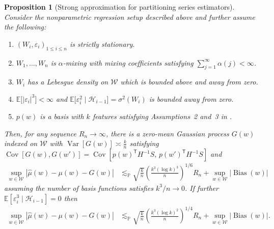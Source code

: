\documentclass[11pt,lof]{puthesis}
\renewcommand{\P}{\ensuremath{\mathbb{P}}}
\newcommand{\E}{\ensuremath{\mathbb{E}}}
\newcommand{\cH}{\ensuremath{\mathcal{H}}}
\newcommand{\cW}{\ensuremath{\mathcal{W}}}
\newcommand{\T}{\ensuremath{\mathsf{T}}}
\DeclareMathOperator{\Var}{Var}
\DeclareMathOperator{\Cov}{Cov}
\DeclareMathOperator{\Bias}{Bias}
\theoremstyle{break}
\newtheorem{proposition}{Proposition}[section]
\theoremstyle{proof}
\begin{document}
\begin{proposition}[Strong approximation for partitioning series estimators]%
  \label{pro:yurinskii_series}
  Consider the nonparametric regression setup described above
  and further assume the following:
  \begin{enumerate}[label=(\roman*)]

    \item
      $(W_i, \varepsilon_i)_{1 \leq i \leq n}$
      is strictly stationary.

    \item
      $W_1, \ldots, W_n$ is $\alpha$-mixing with mixing coefficients
      satisfying $\sum_{j=1}^\infty \alpha(j) < \infty$.

    \item
      $W_i$ has a Lebesgue density on $\cW$
      which is bounded above and away from zero.

    \item
      $\E\big[|\varepsilon_i|^3 \big] < \infty$
      and
      $\E\big[\varepsilon_i^2 \mid \cH_{i-1}\big]=\sigma^2(W_i)$
      is bounded away from zero.

    \item
      $p(w)$ is a basis with $k$ features satisfying
      Assumptions~2 and~3 in \citet{cattaneo2020large}.

  \end{enumerate}
  Then, for any sequence $R_n \to \infty$,
  there is a zero-mean Gaussian process
  $G(w)$ indexed on $\cW$
  with $\Var[G(w)] \asymp\frac{k}{n}$
  satisfying
  $\Cov[G(w), G(w')]
  = \Cov[p(w)^\T H^{-1} S,\, p(w')^\T H^{-1} S]$
  and
  \begin{align*}
    \sup_{w \in \cW}
    \left| \hat\mu(w) - \mu(w) - G(w) \right|
    &\lesssim_\P
    \sqrt{\frac{k}{n}}
    \left( \frac{k^3 (\log k)^3}{n} \right)^{1/6} R_n
    + \sup_{w \in \cW} |\Bias(w)|
  \end{align*}
  assuming the number of basis functions satisfies $k^3 / n \to 0$.
  If further $\E \left[ \varepsilon_i^3 \mid \cH_{i-1} \right] = 0$ then
  \begin{align*}
    \sup_{w \in \cW}
    \left| \hat\mu(w) - \mu(w) - G(w) \right|
    &\lesssim_\P
    \sqrt{\frac{k}{n}}
    \left( \frac{k^3 (\log k)^2}{n} \right)^{1/4} R_n
    + \sup_{w \in \cW} |\Bias(w)|.
  \end{align*}
\end{proposition}
\end{document}
